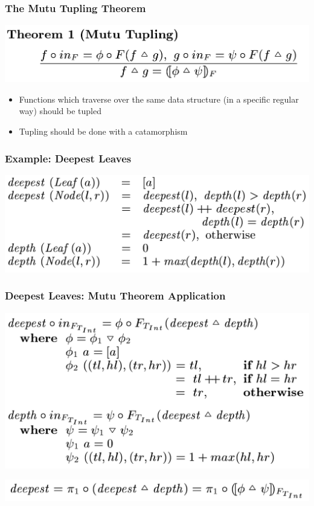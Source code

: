 \documentclass{beamer}
\begin{document}
\begin{frame}[fragile]
  \frametitle{The Mutu Tupling Theorem}
\begin{center}
  \includegraphics[width=\textwidth]{mutu.png}
\end{center}

\begin{itemize}
  \item Functions which traverse over the same data structure (in a specific regular way) should be tupled
  \item Tupling should be done with a catamorphism
\end{itemize}
\end{frame}

\begin{frame}[fragile]
  \frametitle{Example: Deepest Leaves}
\includegraphics[width=\textwidth]{deepestOrig.png}
\end{frame}

\begin{frame}[fragile]
  \frametitle{Deepest Leaves: Mutu Theorem Application}
\includegraphics[width=\textwidth]{deepestMutu.png}

\includegraphics[width=\textwidth]{deepestDef.png}
\end{frame}
\end{document}
